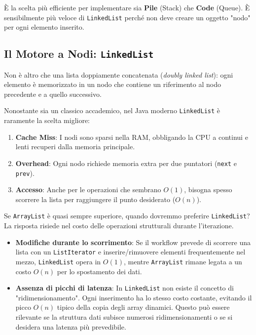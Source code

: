 \begin{bestpractice}
È la scelta più efficiente per implementare sia \textbf{Pile} (Stack) che \textbf{Code} (Queue). È sensibilmente più veloce di \texttt{LinkedList} perché non deve creare un oggetto "nodo" per ogni elemento inserito.
\end{bestpractice}

\subsection{Il Motore a Nodi: \texttt{LinkedList}}

Non è altro che una lista doppiamente concatenata (\textit{doubly linked list}): ogni elemento è memorizzato in un nodo che contiene un riferimento al nodo precedente e a quello successivo.

Nonostante sia un classico accademico, nel Java moderno \texttt{LinkedList} è raramente la scelta migliore:
\begin{enumerate}
    \item \textbf{Cache Miss}: I nodi sono sparsi nella RAM, obbligando la CPU a continui e lenti recuperi dalla memoria principale.
    \item \textbf{Overhead}: Ogni nodo richiede memoria extra per due puntatori (\texttt{next} e \texttt{prev}).
    \item \textbf{Accesso}: Anche per le operazioni che sembrano $O(1)$, bisogna spesso scorrere la lista per raggiungere il punto desiderato ($O(n)$).
\end{enumerate}

\medskip

Se \texttt{ArrayList} è quasi sempre superiore, quando dovremmo preferire \texttt{LinkedList}? La risposta risiede nel costo delle operazioni strutturali durante l'iterazione.

\begin{itemize}
    \item \textbf{Modifiche durante lo scorrimento}: Se il workflow prevede di scorrere una lista con un \texttt{ListIterator} e inserire/rimuovere elementi frequentemente nel mezzo, \texttt{LinkedList} opera in \textbf{$O(1)$}, mentre \texttt{ArrayList} rimane legata a un costo \textbf{$O(n)$} per lo spostamento dei dati.
    \item \textbf{Assenza di picchi di latenza}: In \texttt{LinkedList} non esiste il concetto di "ridimensionamento". Ogni inserimento ha lo stesso costo costante, evitando il picco $O(n)$ tipico della copia degli array dinamici. Questo può essere rilevante se la struttura dati subisce numerosi ridimensionamenti o se si desidera una latenza più prevedibile.
\end{itemize}

